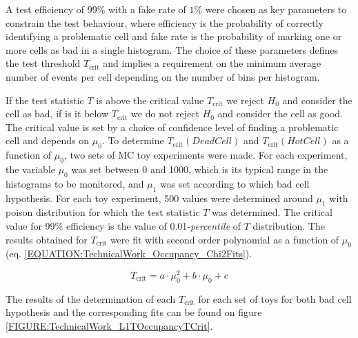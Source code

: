 A test efficiency of $99\%$ with a fake rate of $1\%$ were chosen as key parameters to constrain the test behaviour, where efficiency is the probability of correctly identifying a problematic cell and fake rate is the probability of marking one or more cells as bad in a single histogram. The choice of these parameters defines the test threshold $T_{\text{crit}}$ and implies a requirement on the minimum average number of events per cell depending on the number of bins per histogram.

If the test statistic $T$ is above the critical value $T_{\text{crit}}$ we reject $H_0$ and consider the cell as bad, if is it below $T_{\text{crit}}$ we do not reject $H_0$ and consider the cell as good. The critical value is set by a choice of confidence level of finding a problematic cell and depends on $\mu_0$. To determine $T_{\text{crit}}(Dead Cell)$ and $T_{\text{crit}}(Hot Cell)$ as a function of $\mu_0$, two sets of \gls{MC} toy experiments were made. For each experiment, the variable $\mu_0$ was set between 0 and 1000, which is its typical range in the histograms to be monitored, and $\mu_1$ was set according to which bad cell hypothesis. For each toy experiment, 500 values were determined around $\mu_1$ with poison distribution for which the test statistic $T$ was determined. The critical value for 99\% efficiency is the value of 0.01-\textit{percentile} of $T$ distribution. The results obtained for $T_{\text{crit}}$ were fit with second order polynomial as a function of $\mu_0$ (eq. \ref{EQUATION:TechnicalWork_Occupancy_Chi2Fits}).

\begin{equation}
T_{\text{crit}}=a \cdot \mu_0^2 + b \cdot \mu_0 + c
\label{EQUATION:TechnicalWork_Occupancy_Chi2Fits}
\end{equation}

The results of the determination of each $T_{\text{crit}}$ for each set of toys for both bad cell hypothesis and the corresponding fits can be found on figure \ref{FIGURE:TechnicalWork_L1TOccupancyTCrit}.

